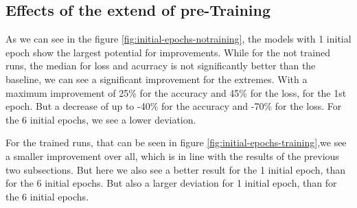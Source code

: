 \subsection{Effects of the extend of pre-Training}\label{subsec:effects-of-the-extend-of-pre-training}
As we can see in the figure \ref{fig:initial-epochs-notraining}, the models with 1 initial epoch show the largest potential for improvements.
While for the not trained runs, the median for loss and acurracy is not significantly better than the baseline, we can see a significant improvement for the extremes.
With a maximum improvement of 25\% for the accuracy and 45\% for the loss, for the 1st epoch.
But a decrease of up to -40\% for the accuracy and -70\% for the loss.
For the 6 initial epochs, we see a lower deviation.

For the trained runs, that can be seen in figure \ref{fig:initial-epochs-training},we see a smaller improvement over all, which is in line with the results of the previous two subsections.
But here we also see a better result for the 1 initial epoch, than for the 6 initial epochs.
But also a larger deviation for 1 initial epoch, than for the 6 initial epochs.

